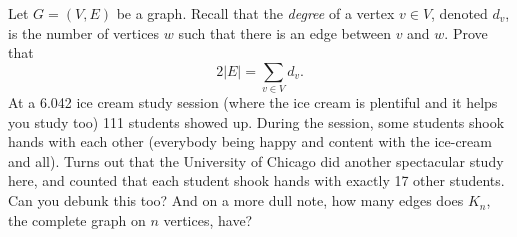 \documentclass[12pt,twoside]{article}
\begin{document}
\begin{problem}{20}
Let $G = (V,E)$ be a graph. Recall that the {\em degree} of a vertex $v \in V$, denoted $d_v$, is the number of vertices $w$ such that there is an edge between $v$ and $w$.
\bparts
{}
Prove that $$2|E| = \sum_{v\in V} d_v.$$
 At a 6.042 ice cream study session (where the ice cream is plentiful and it helps you study too) 111 students showed up. During the session, some students shook hands with each other (everybody being happy and content with the ice-cream and all). Turns out that the University of Chicago did another spectacular study here, and counted that each student shook hands with exactly 17 other students. Can you debunk this too?
And on a more dull note, how many edges does $K_n$, the complete graph on $n$ vertices, have?
\eparts

\end{problem}
\end{document}
